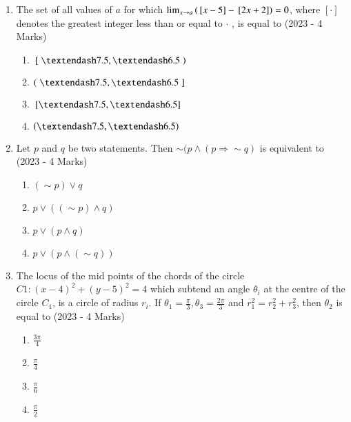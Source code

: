 \documentclass[journal]{IEEEtran}
\begin{document}
    \begin{enumerate}
    \item{
          	The set of all values of $a$ for which $\lim_{x\to a} \left({}\left[x-5\right] - {}\left[2x+2\right]\right)= 0$, where $[\cdot]$ denotes the greatest integer less than or equal to $\cdot$ , is equal to \text{  } \hfill
                {(2023 - 4 Marks)}
                \begin{multicols}{4}
					\begin{enumerate}
						\item $\lsbrak{}–7.5, –6.5\rbrak{} $
						\item $\lbrak{}–7.5, –6.5\rsbrak{} $
						\item $\sbrak{–7.5, –6.5} $
						\item $\brak{–7.5, –6.5} $
					\end{enumerate}
				\end{multicols}
            }
    \item{
           	Let $p$ and $q$ be two statements. Then $\sim (p \land (p \Rightarrow \sim q)$ is equivalent to \\ \text{ }
           	\hfill
           	{(2023 - 4 Marks)}
                \begin{multicols}{4}
                	\begin{enumerate}
                		\item $(\sim p) \lor q$
                		\item $p \lor ((\sim p) \land q)$
                		\item $p \lor (p \land q)$
                		\item $p \lor (p \land(\sim q))$
                	\end{enumerate}
                \end{multicols}
        }
\item{
        	
        	The locus of the mid points of the chords of the circle $C1: (x - 4)^2 + (y - 5)^2 = 4$ which subtend an angle $\theta_i$ at the centre of the circle $C_1$, is a circle of radius $r_i$. If $\theta_1 = \frac{\pi}{3}, \theta_3 = \frac{2\pi}{3}$ and $r_1^2 = r_2^2+r_3^2$, then $\theta_2$ is equal to
        	\hfill
        	{(2023 - 4 Marks)}
        	\begin{multicols}{4}
        		\begin{enumerate}
        			\item  $\frac{3\pi}{4}$
        			\item  $\frac{\pi}{4}$
        			\item  $\frac{\pi}{6}$
        			\item  $\frac{\pi}{2}$
        		\end{enumerate}
        	\end{multicols}
        	
}
\end{enumerate}
\end{document}
